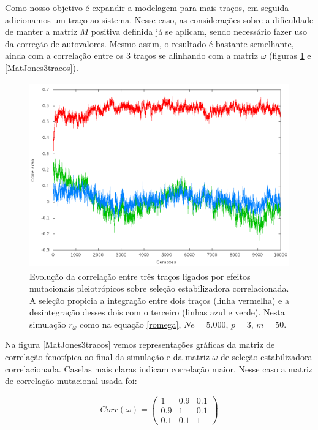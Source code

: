 Como nosso objetivo é expandir a modelagem para mais traços, em seguida
adicionamos um traço ao sistema. 
Nesse caso, as considerações sobre a dificuldade de manter a matriz $M$
positiva definida já se aplicam, sendo necessário fazer uso da correção
de autovalores. 
Mesmo assim, o resultado é bastante semelhante, ainda com a correlação
entre os 3 traços se alinhando com a matriz $\omega$ (figuras
\ref{jones3tracos} e \ref{MatJones3tracos}). 


\begin{figure}[htbp]
  \centering
  \includegraphics[width=150mm, height=80mm]{figuras/jones3tracos.png}
  \caption{Evolução da correlação entre três traços ligados por efeitos
  mutacionais pleiotrópicos sobre seleção estabilizadora correlacionada.
  A seleção propicia a integração entre dois traços (linha vermelha) e a desintegração
  desses dois com o terceiro (linhas azul e verde). Nesta simulação
  $r_\omega$ como na equação \ref{romega}, $Ne=5.000$, $p=3$, $m=50$.}
  \label{jones3tracos}
\end{figure}


Na figura \ref{MatJones3tracos} vemos representações gráficas da matriz
de correlação fenotípica ao final da simulação e da matriz $\omega$ de
seleção estabilizadora correlacionada. 
Caselas mais claras indicam correlação maior. 
Nesse caso a matriz de correlação mutacional usada foi:

\begin{equation}
Corr(\omega) = \left( \begin{smallmatrix} 1 & 0.9 & 0.1\\  0.9 & 1 & 0.1 \\ 0.1 & 0.1 & 1 \end{smallmatrix}  \right)
\label{romega}
\end{equation}

